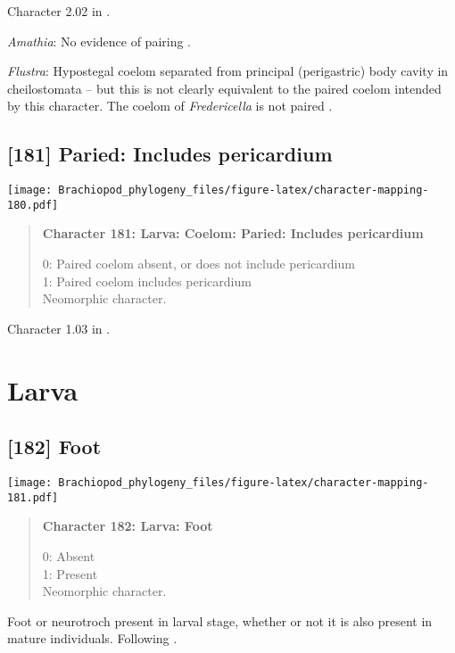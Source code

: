 \documentclass[openany]{book}
\theoremstyle{definition}
\theoremstyle{definition}
\theoremstyle{definition}
\theoremstyle{remark}
\begin{document}
Character 2.02 in \citet{Scheltema1993}.

\hypertarget{Amathia-coding-180}{}
\emph{Amathia}: No evidence of pairing \citep{Reed1982}.

\hypertarget{Flustra-coding-180}{}
\emph{Flustra}: Hypostegal coelom separated from principal (perigastric)
body cavity in cheilostomata -- but this is not clearly equivalent to
the paired coelom intended by this character. The coelom of
\emph{Fredericella} is not paired \citep{Gruhl2010F}.

\subsection*{{[}181{]} Paried: Includes
pericardium}\label{paried-includes-pericardium}

\texttt{[image: Brachiopod\_phylogeny\_files/figure-latex/character-mapping-180.pdf]}

\begin{quote}
\textbf{Character 181: Larva: Coelom: Paried: Includes pericardium}

0: Paired coelom absent, or does not include pericardium\\
1: Paired coelom includes pericardium\\
Neomorphic character.
\end{quote}

Character 1.03 in \citet{Scheltema1993}.

\section{Larva}\label{larva-1}

\subsection*{{[}182{]} Foot}\label{foot-1}

\texttt{[image: Brachiopod\_phylogeny\_files/figure-latex/character-mapping-181.pdf]}

\begin{quote}
\textbf{Character 182: Larva: Foot}

0: Absent\\
1: Present\\
Neomorphic character.
\end{quote}

Foot or neurotroch present in larval stage, whether or not it is also
present in mature individuals. Following \citet{Wingstrand1985}.
\end{document}
